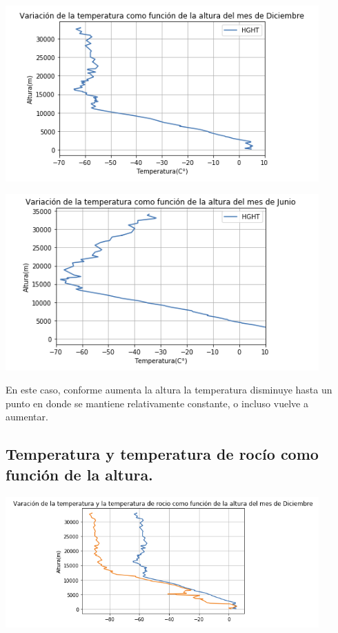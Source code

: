\documentclass{article}
\begin{document}
\begin{center}
	\includegraphics[width=12cm]{graph2D.png}
\end{center}

\begin{center}
	\includegraphics[width=12cm]{graph2J.png}
\end{center}
\vspace{0.3cm}

En este caso, conforme aumenta la altura la temperatura disminuye hasta un punto en donde se mantiene relativamente constante, o incluso vuelve a aumentar.

\subsection{Temperatura y temperatura de rocío como función de la altura.}

\begin{center}
	\includegraphics[width=12cm]{graph3D.png}
\end{center}
\end{document}
